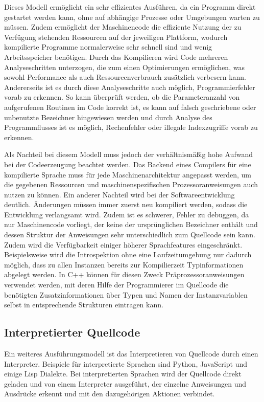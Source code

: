 \documentclass[11pt, parskip=half]{scrartcl}       %
\begin{document}
Dieses Modell ermöglicht ein sehr effizientes Ausführen, da ein Programm direkt gestartet werden kann, ohne auf abhängige Prozesse oder Umgebungen warten zu müssen.
Zudem ermöglicht der Maschinencode die effiziente Nutzung der zu Verfügung stehenden Ressourcen auf der jeweiligen Plattform, wodurch kompilierte Programme normalerweise sehr schnell sind und wenig Arbeitsspeicher benötigen.
Durch das Kompilieren wird Code mehreren Analyseschritten unterzogen, die zum einen Optimierungen ermöglichen, was sowohl Performance als auch Ressourcenverbrauch zusätzlich verbesern kann.
Andererseits ist es durch diese Analyseschritte auch möglich, Programmierfehler vorab zu erkennen.
So kann überprüft werden, ob die Parameteranzahl von aufgerufenen Routinen im Code korrekt ist, es kann auf falsch geschriebene oder unbenutzte Bezeichner hingewiesen werden und durch Analyse des Programmflusses ist es möglich, Rechenfehler oder illegale Indexzugriffe vorab zu erkennen.


Als Nachteil bei diesem Modell muss jedoch der verhältnismäßig hohe Aufwand bei der Codeerzeugung beachtet werden.
Das Backend eines Compilers für eine kompilierte Sprache muss für jede Maschinenarchitektur angepasst werden, um die gegebenen Ressourcen und maschinenspezifischen Prozessoranweisungen auch nutzen zu können.
Ein anderer Nachteil wird bei der Softwareentwicklung deutlich.
Änderungen müssen immer zuerst neu kompiliert werden, sodass die Entwicklung verlangsamt wird.
Zudem ist es schwerer, Fehler zu debuggen, da nur Maschinencode vorliegt, der keine der ursprünglichen Bezeichner enthält und dessen Struktur der Anweisungen sehr unterschiedlich zum Quellcode sein kann. %
Zudem wird die Verfügbarkeit einiger höherer Sprachfeatures eingeschränkt.
Beispielsweise wird die Introspektion ohne eine Laufzeitumgebung nur dadurch möglich, dass zu allen Instanzen bereits zur Kompilierzeit Typinformationen abgelegt werden.
In C++ können für diesen Zweck Präprozessoranweisungen verwendet werden, mit deren Hilfe der Programmierer im Quellcode die benötigten Zusatzinformationen über Typen und Namen der Instanzvariablen selbst in entsprechende Strukturen eintragen kann.

\subsection{Interpretierter Quellcode}

Ein weiteres Ausführungsmodell ist das Interpretieren von Quellcode durch einen Interpreter.
Beispiele für interpretierte Sprachen sind Python, JavaScript und einige Lisp Dialekte.
Bei interpretierten Sprachen wird der Quellcode direkt geladen und von einem Interpreter ausgeführt, der einzelne Anweisungen und Ausdrücke erkennt und mit den dazugehörigen Aktionen verbindet.
\end{document}
